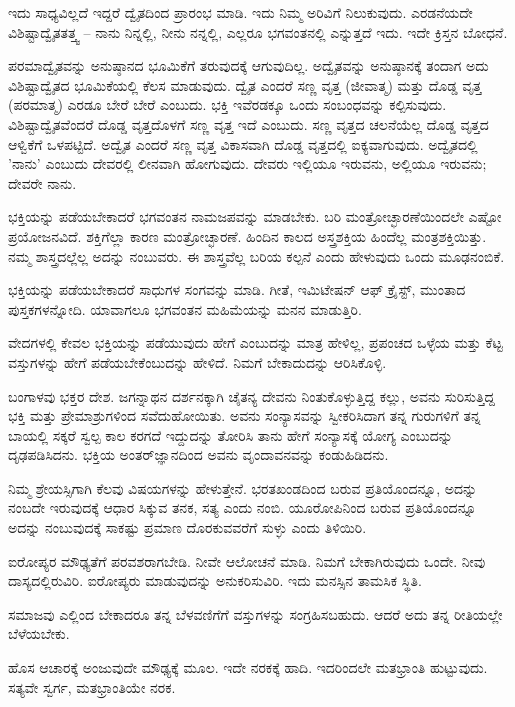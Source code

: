 ಇದು ಸಾಧ್ಯವಿಲ್ಲದೆ ಇದ್ದರೆ ದ್ವೈತದಿಂದ ಪ್ರಾರಂಭ ಮಾಡಿ. ಇದು ನಿಮ್ಮ ಅರಿವಿಗೆ ನಿಲುಕುವುದು. ಎರಡನೆಯದೇ ವಿಶಿಷ್ಟಾದ್ವೈತತತ್ತ್ವ – ನಾನು ನಿನ್ನಲ್ಲಿ, ನೀನು ನನ್ನಲ್ಲಿ, ಎಲ್ಲರೂ ಭಗವಂತನಲ್ಲಿ ಎನ್ನುತ್ತದೆ ಇದು. ಇದೇ ಕ್ರಿಸ್ತನ ಬೋಧನೆ.

ಪರಮಾದ್ವೈತವನ್ನು ಅನುಷ್ಠಾನದ ಭೂಮಿಕೆಗೆ ತರುವುದಕ್ಕೆ ಆಗುವುದಿಲ್ಲ. ಅದ್ವೈತವನ್ನು ಅನುಷ್ಠಾನಕ್ಕೆ ತಂದಾಗ ಅದು ವಿಶಿಷ್ಟಾದ್ವೈತದ ಭೂಮಿಕೆಯಲ್ಲಿ ಕೆಲಸ ಮಾಡುವುದು. ದ್ವೈತ ಎಂದರೆ ಸಣ್ಣ ವೃತ್ತ (ಜೀವಾತ್ಮ) ಮತ್ತು ದೊಡ್ಡ ವೃತ್ತ (ಪರಮಾತ್ಮ) ಎರಡೂ ಬೇರೆ ಬೇರೆ ಎಂಬುದು. ಭಕ್ತಿ ಇವೆರಡಕ್ಕೂ ಒಂದು ಸಂಬಂಧವನ್ನು ಕಲ್ಪಿಸುವುದು. ವಿಶಿಷ್ಟಾದ್ವೈತವೆಂದರೆ ದೊಡ್ಡ ವೃತ್ತದೊಳಗೆ ಸಣ್ಣ ವೃತ್ತ ಇದೆ ಎಂಬುದು. ಸಣ್ಣ ವೃತ್ತದ ಚಲನೆಯೆಲ್ಲ ದೊಡ್ಡ ವೃತ್ತದ ಆಳ್ವಿಕೆಗೆ ಒಳಪಟ್ಟಿದೆ. ಅದ್ವೈತ ಎಂದರೆ ಸಣ್ಣ ವೃತ್ತ ವಿಕಾಸವಾಗಿ ದೊಡ್ಡ ವೃತ್ತದಲ್ಲಿ ಐಕ್ಯವಾಗುವುದು. ಅದ್ವೈತದಲ್ಲಿ 'ನಾನು' ಎಂಬುದು ದೇವರಲ್ಲಿ ಲೀನವಾಗಿ ಹೋಗುವುದು. ದೇವರು ಇಲ್ಲಿಯೂ ಇರುವನು, ಅಲ್ಲಿಯೂ ಇರುವನು; ದೇವರೇ ನಾನು.

ಭಕ್ತಿಯನ್ನು ಪಡೆಯಬೇಕಾದರೆ ಭಗವಂತನ ನಾಮಜಪವನ್ನು ಮಾಡಬೇಕು. ಬರಿ ಮಂತ್ರೋಚ್ಛಾರಣೆಯಿಂದಲೇ ಎಷ್ಟೋ ಪ್ರಯೋಜನವಿದೆ. ಶಕ್ತಿಗೆಲ್ಲಾ ಕಾರಣ ಮಂತ್ರೋಚ್ಛಾರಣೆ. ಹಿಂದಿನ ಕಾಲದ ಅಸ್ತ್ರಶಕ್ತಿಯ ಹಿಂದೆಲ್ಲ ಮಂತ್ರಶಕ್ತಿಯಿತ್ತು. ನಮ್ಮ ಶಾಸ್ತ್ರದಲ್ಲೆಲ್ಲ ಅದನ್ನು ನಂಬುವರು. ಈ ಶಾಸ್ತ್ರವೆಲ್ಲ ಬರಿಯ ಕಲ್ಪನೆ ಎಂದು ಹೇಳುವುದು ಒಂದು ಮೂಢನಂಬಿಕೆ.

ಭಕ್ತಿಯನ್ನು ಪಡೆಯಬೇಕಾದರೆ ಸಾಧುಗಳ ಸಂಗವನ್ನು ಮಾಡಿ. ಗೀತೆ, ಇಮಿಟೇಷನ್ ಆಫ್ ಕ್ರೈಸ್ಟ್,  ಮುಂತಾದ ಪುಸ್ತಕಗಳನ್ನೋದಿ. ಯಾವಾಗಲೂ ಭಗವಂತನ ಮಹಿಮೆಯನ್ನು ಮನನ ಮಾಡುತ್ತಿರಿ.

ವೇದಗಳಲ್ಲಿ ಕೇವಲ ಭಕ್ತಿಯನ್ನು ಪಡೆಯುವುದು ಹೇಗೆ ಎಂಬುದನ್ನು ಮಾತ್ರ ಹೇಳಿಲ್ಲ, ಪ್ರಪಂಚದ ಒಳ್ಳೆಯ ಮತ್ತು ಕೆಟ್ಟ ವಸ್ತುಗಳನ್ನು ಹೇಗೆ ಪಡೆಯಬೇಕೆಂಬುದನ್ನು ಹೇಳಿದೆ. ನಿಮಗೆ ಬೇಕಾದುದನ್ನು ಆರಿಸಿಕೊಳ್ಳಿ.

ಬಂಗಾಳವು ಭಕ್ತರ ದೇಶ. ಜಗನ್ನಾಥನ ದರ್ಶನಕ್ಕಾಗಿ ಚೈತನ್ಯ ದೇವನು ನಿಂತುಕೊಳ್ಳುತ್ತಿದ್ದ ಕಲ್ಲು, ಅವನು ಸುರಿಸುತ್ತಿದ್ದ ಭಕ್ತಿ ಮತ್ತು ಪ್ರೇಮಾಶ್ರುಗಳಿಂದ ಸವೆದುಹೋಯಿತು. ಅವನು ಸಂನ್ಯಾಸವನ್ನು ಸ್ವೀಕರಿಸಿದಾಗ ತನ್ನ ಗುರುಗಳಿಗೆ ತನ್ನ ಬಾಯಲ್ಲಿ ಸಕ್ಕರೆ ಸ್ವಲ್ಪ ಕಾಲ ಕರಗದೆ ಇದ್ದುದನ್ನು ತೋರಿಸಿ ತಾನು ಹೇಗೆ ಸಂನ್ಯಾಸಕ್ಕೆ ಯೋಗ್ಯ ಎಂಬುದನ್ನು ದೃಢಪಡಿಸಿದನು. ಭಕ್ತಿಯ ಅಂತರ್‌ಜ್ಞಾನದಿಂದ ಅವನು ವೃಂದಾವನವನ್ನು ಕಂಡುಹಿಡಿದನು.

ನಿಮ್ಮ ಶ್ರೇಯಸ್ಸಿಗಾಗಿ ಕೆಲವು ವಿಷಯಗಳನ್ನು ಹೇಳುತ್ತೇನೆ. ಭರತಖಂಡದಿಂದ ಬರುವ ಪ್ರತಿಯೊಂದನ್ನೂ, ಅದನ್ನು ನಂಬದೇ ಇರುವುದಕ್ಕೆ ಆಧಾರ ಸಿಕ್ಕುವ ತನಕ, ಸತ್ಯ ಎಂದು ನಂಬಿ. ಯೂರೋಪಿನಿಂದ ಬರುವ ಪ್ರತಿಯೊಂದನ್ನೂ ಅದನ್ನು ನಂಬುವುದಕ್ಕೆ ಸಾಕಷ್ಟು ಪ್ರಮಾಣ ದೊರಕುವವರೆಗೆ ಸುಳ್ಳು ಎಂದು ತಿಳಿಯಿರಿ.

ಐರೋಪ್ಯರ ಮೌಢ್ಯತೆಗೆ ಪರವಶರಾಗಬೇಡಿ. ನೀವೇ ಆಲೋಚನೆ ಮಾಡಿ. ನಿಮಗೆ ಬೇಕಾಗಿರುವುದು ಒಂದೇ. ನೀವು ದಾಸ್ಯದಲ್ಲಿರುವಿರಿ. ಐರೋಪ್ಯರು ಮಾಡುವುದನ್ನು ಅನುಕರಿಸುವಿರಿ. ಇದು ಮನಸ್ಸಿನ ತಾಮಸಿಕ ಸ್ಥಿತಿ.

ಸಮಾಜವು ಎಲ್ಲಿಂದ ಬೇಕಾದರೂ ತನ್ನ ಬೆಳವಣಿಗೆಗೆ ವಸ್ತುಗಳನ್ನು ಸಂಗ್ರಹಿಸಬಹುದು. ಆದರೆ ಅದು ತನ್ನ ರೀತಿಯಲ್ಲೇ ಬೆಳೆಯಬೇಕು.

ಹೊಸ ಆಚಾರಕ್ಕೆ ಅಂಜುವುದೇ ಮೌಢ್ಯಕ್ಕೆ ಮೂಲ. ಇದೇ ನರಕಕ್ಕೆ ಹಾದಿ. ಇದರಿಂದಲೇ ಮತಭ್ರಾಂತಿ ಹುಟ್ಟುವುದು. ಸತ್ಯವೇ ಸ್ವರ್ಗ, ಮತಭ್ರಾಂತಿಯೇ ನರಕ.

